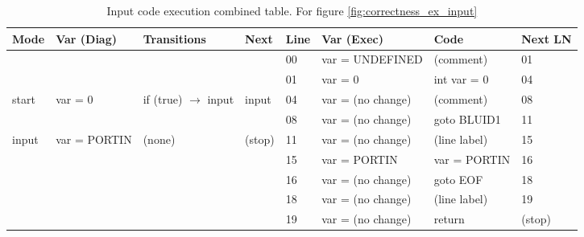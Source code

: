 \begin{table}[htcb]
	\caption{Input code execution combined table. For figure \ref{fig:correctness_ex_input}}
	\centering
	\tablefontsize
		\begin{tabular}{| p{} | p{} | p{} | p{} | p{} | p{} | p{} | p{} |}
			\hline
			\textbf{Mode} 		&	\textbf{Var (Diag)} 		& 	\textbf{Transitions} 		& 	\textbf{Next}		&	\textbf{Line}		&	\textbf{Var (Exec)	}	&	\textbf{Code}	&	\textbf{Next LN} \\
			\hline			
								&								&								&						&	00					& 	var = UNDEFINED			&	(comment)		&	01	\\
			\hline
								&								&								&						&	01					&	var = 0					&	int var = 0		&	04	\\
			\hline
			start 				&	var = 0						&if (true) $\rightarrow$ input	&	input				&	04					&	var = (no change)		& 	(comment)		&	08	\\
			\hline
								&								&								&						&	08					&	var = (no change)		&	goto BLUID1		&	11	\\
			\hline
			input				&	var = PORTIN				&	(none)						&	(stop)				&	11					&	var = (no change)		&	(line label)	&	15	\\
			\hline
								&								&								&						&	15					&	var = PORTIN			&	var = PORTIN	&	16	\\
			\hline
								&								&								&						&	16					&	var = (no change)		&	goto EOF		&	18	\\
			\hline
								&								&								&						&	18					&	var = (no change)		&	(line label)	&	19	\\
			\hline
								&								&								&						&	19					&	var = (no change)		&	return			&	(stop)	\\
			\hline
		\end{tabular}
	\label{table:InputExecCombined}
\end{table}

